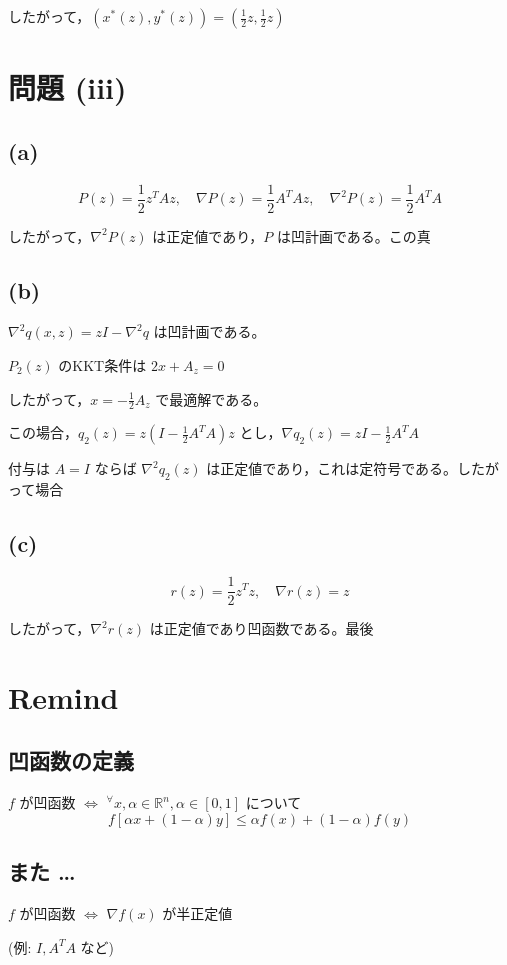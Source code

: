 \documentclass[12pt,a4paper]{article}
\begin{document}
したがって，$(x^*(z), y^*(z)) = (\frac{1}{2}z, \frac{1}{2}z)$

\section*{問題 (iii)}

\subsection*{(a)}

\[P(z) = \frac{1}{2}z^T A z, \quad \nabla P(z) = \frac{1}{2}A^T A z, \quad \nabla^2 P(z) = \frac{1}{2}A^T A\]

したがって，$\nabla^2 P(z)$ は正定値であり，$P$ は凹計画である。この真

\subsection*{(b)}

$\nabla^2 q(x,z) = zI - \nabla^2 q$ は凹計画である。

$P_2(z)$ のKKT条件は $2x + A_z = 0$

したがって，$x = -\frac{1}{2}A_z$ で最適解である。

この場合，$q_2(z) = z(I - \frac{1}{2}A^T A)z$ とし，$\nabla q_2(z) = zI - \frac{1}{2}A^T A$

付与は $A = I$ ならば $\nabla^2 q_2(z)$ は正定値であり，これは定符号である。したがって場合

\subsection*{(c)}

\[r(z) = \frac{1}{2}z^T z, \quad \nabla r(z) = z\]

したがって，$\nabla^2 r(z)$ は正定値であり凹函数である。最後

\newpage

\section*{Remind}

\subsection*{凹函数の定義}

$f$ が凹函数 $\Leftrightarrow$ ${}^\forall x, \alpha \in \mathbb{R}^n, \alpha \in [0,1]$ について
\[f[\alpha x + (1-\alpha)y] \leq \alpha f(x) + (1-\alpha)f(y)\]

\subsection*{また …}

$f$ が凹函数 $\Leftrightarrow$ $\nabla f(x)$ が半正定値

(例: $I, A^T A$ など)
\end{document}
